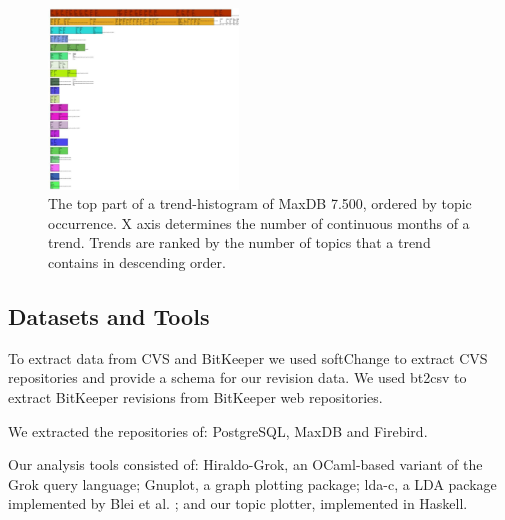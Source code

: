 \documentclass[times, 10pt,twocolumn]{article}
\newcommand{\shrinkit}{\vspace*{-.3em}}
\begin{document}
\begin{figure}
  \centering
  \includegraphics[width=0.45\textwidth]{histogram-cropped-scaled}
  \caption{The top part of a trend-histogram of MaxDB 7.500, ordered
    by topic occurrence. X axis determines the number of continuous
    months of a trend. Trends are ranked by the number of topics that
    a trend contains in descending order.}
  \label{fig:histogram}
\end{figure}

\shrinkit
\subsection{Datasets and Tools}
\shrinkit

To extract data from CVS and BitKeeper we used softChange to extract
CVS repositories and provide a schema for our revision data. We used
bt2csv to extract BitKeeper revisions from BitKeeper web repositories.

We extracted the repositories of: PostgreSQL, MaxDB and
Firebird.


Our analysis tools consisted of: Hiraldo-Grok, an OCaml-based variant
of the Grok query language; Gnuplot, a graph plotting package; lda-c,
a LDA package implemented by Blei et al. \cite{944937}; and our topic
plotter, implemented in Haskell.




\end{document}
